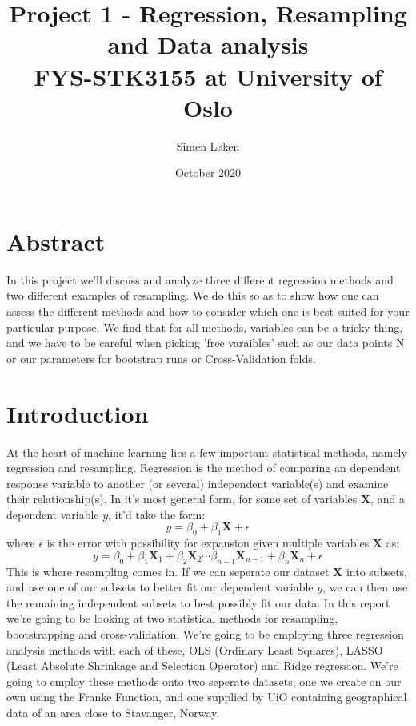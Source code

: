 \documentclass{article}
\title{%
Project 1 - Regression, Resampling and Data analysis\\
\large FYS-STK3155 at University of Oslo}
\author{Simen Løken}
\date{October 2020}
\begin{document}
\nocite{proj1}
\maketitle
\section{Abstract}
In this project we'll discuss and analyze three different regression methods and two different examples of resampling. We do this so as to show how one can assess the different methods and how to consider which one is best suited for your particular purpose. \newline
We find that for all methods, variables can be a tricky thing, and we have to be careful when picking 'free varaibles' such as our data points N or our parameters for bootstrap runs or Cross-Validation folds.
\section{Introduction}
At the heart of machine learning lies a few important statistical methods, namely regression and \newline resampling. Regression is the method of comparing an dependent response variable to another (or several) independent variable(s) and examine their relationship(s). In it's most general form, for some set of variables $\mathbf{X}$, and a dependent variable $y$, it'd take the form:
\begin{equation} \label{1}
    y = \beta_0 + \beta_1 \mathbf{X} + \epsilon
\end{equation}
\newline where $\epsilon$ is the error
\newline with possibility for expansion given multiple variables $\mathbf{X}$ as:
\begin{equation*}
    y = \beta_0 + \beta_1 \mathbf{X}_1 + \beta_2 \mathbf{X}_2 \cdots \beta_{n-1} \mathbf{X}_{n-1} + \beta_n \mathbf{X}_n + \epsilon
\end{equation*}
\newline
This is where resampling comes in. If we can seperate our dataset $\mathbf{X}$ into subsets, and use one of our subsets to better fit our dependent variable $y$, we can then use the remaining independent subsets to best possibly fit our data. \newline
In this report we're going to be looking at two statistical methods for resampling, bootstrapping and cross-validation. We're going to be employing three regression analysis methods with each of these, OLS (Ordinary Least Squares), LASSO (Least Absolute Shrinkage and Selection Operator) and Ridge regression.
We're going to employ these methods onto two seperate datasets, one we create on our own using the Franke Function, and one supplied by UiO containing geographical data of an area close to Stavanger, Norway.
\end{document}

